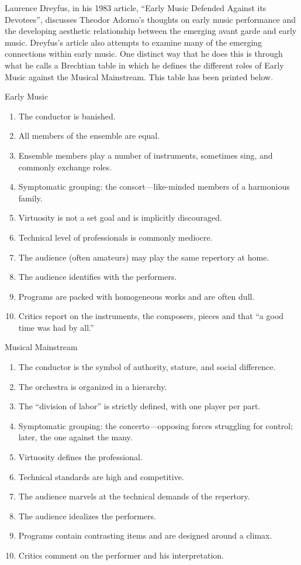 \documentclass[12pt]{article}
\begin{document}
Laurence Dreyfus, in his 1983 article, ``Early Music Defended Against
its Devotees'', discusses Theodor Adorno's thoughts on early music
performance and the developing aesthetic relationship between the
emerging avant garde and early music. Dreyfus's article also attempts
to examine many of the emerging connections within early music. One
distinct way that he does this is through what he calls a Brechtian
table in which he defines the different roles of Early Music against
the Musical Mainstream.\autocite[317--318]{dreyfus1983} This table has
been printed below.
\clearpage
\begin{multicols}{2}
  Early Music\\
  \begin{enumerate}
  \item The conductor is banished.
  \item All members of the ensemble are equal.
  \item Ensemble members play a number of instruments, sometimes sing, and commonly exchange roles.
  \item Symptomatic grouping: the consort---like-minded members of a harmonious family.
  \item Virtuosity is not a set goal and is implicitly discouraged.
  \item Technical level of professionals is commonly mediocre.
  \item The audience (often amateurs) may play the same repertory at home.
  \item The audience identifies with the performers.
  \item Programs are packed with homogeneous works and are often dull.
  \item Critics report on the instruments, the composers, pieces and that ``a good time was had by all.''
    \end{enumerate}
    \columnbreak
    Musical Mainstream\\
    \begin{enumerate}
  \item The conductor is the symbol of authority, stature, and social difference.
  \item The orchestra is organized in a hierarchy.
  \item The ``division of labor'' is strictly defined, with one player per part.
  \item Symptomatic grouping: the concerto---opposing forces struggling for control; later, the one against the many.
  \item Virtuosity defines the professional.
  \item Technical standards are high and competitive.
  \item The audience marvels at the technical demands of the repertory.
  \item The audience idealizes the performers.
  \item Programs contain contrasting items and are designed around a climax.
  \item Critics comment on the performer and his interpretation.
  \end{enumerate}
\end{multicols}
\end{document}
